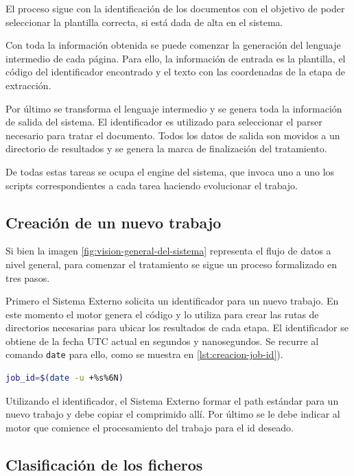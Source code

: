 El proceso sigue con la identificación de los documentos con el objetivo de poder seleccionar la plantilla correcta, si está dada de alta en el sistema. 

Con toda la información obtenida se puede comenzar la generación del lenguaje intermedio de cada página. Para ello, la información de entrada es la plantilla, el código del identificador encontrado y el texto con las coordenadas de la etapa de extracción.

Por último se transforma el lenguaje intermedio y se genera toda la información de salida del sistema. El identificador es utilizado para seleccionar el parser necesario para tratar el documento. Todos los datos de salida son movidos a un directorio de resultados y se genera la marca de finalización del tratamiento.

De todas estas tareas se ocupa el engine del sistema, que invoca uno a uno los scripts correspondientes a cada tarea haciendo evolucionar el trabajo.

\subsection{Creación de un nuevo trabajo}

Si bien la imagen \ref{fig:vision-general-del-sistema} representa el flujo de datos a nivel general, para comenzar el tratamiento se sigue un proceso formalizado en tres pasos. 

Primero el Sistema Externo solicita un identificador para un nuevo trabajo. En este momento el motor genera el código y lo utiliza para crear las rutas de directorios necesarias para ubicar los resultados de cada etapa. El identificador se obtiene de la fecha UTC actual en segundos y nanosegundos. Se recurre al comando \verb|date| para ello, como se muestra en \ref{lst:creacion-job-id}).

\begin{lstlisting}[language=bash,caption={Obtención del identificador de un trabajo},label=lst:creacion-job-id]
job_id=$(date -u +%s%6N)
\end{lstlisting}

Utilizando el identificador, el Sistema Externo formar el path estándar para un nuevo trabajo y debe copiar el comprimido allí. Por último se le debe indicar al motor que comience el procesamiento del trabajo para el id deseado.

\subsection{Clasificación de los ficheros}

